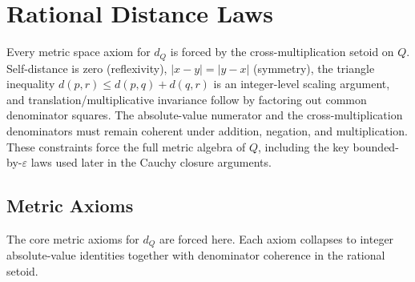 \documentclass[11pt,a4paper]{book}
\def\mathbb#1{#1}%
\begin{document}
\chapter{Rational Distance Laws}
\label{ch:rat-dist}

Every metric space axiom for $d_{\mathbb{Q}}$ is forced by the
cross-multiplication setoid on $\mathbb{Q}$. Self-distance is zero
(reflexivity), $|x-y| = |y-x|$ (symmetry), the triangle inequality
$d(p,r) \le d(p,q) + d(q,r)$ is an integer-level
scaling argument, and translation/multiplicative invariance follow by
factoring out common denominator squares.
The absolute-value numerator and the cross-multiplication denominators must
remain coherent under addition, negation, and multiplication.  These
constraints force the full metric algebra of $\mathbb{Q}$, including the key
bounded-by-$\varepsilon$ laws used later in the Cauchy closure arguments.

\section{Metric Axioms}

The core metric axioms for $d_{\mathbb{Q}}$ are forced here. Each axiom
collapses to integer absolute-value identities together with denominator
coherence in the rational setoid.
\end{document}
